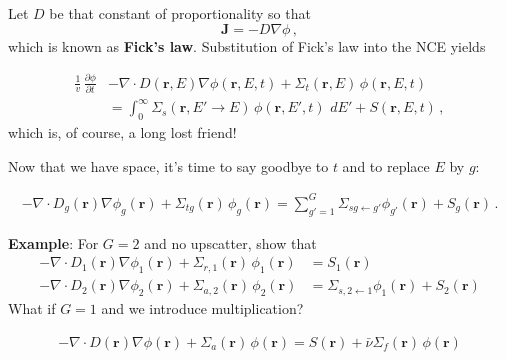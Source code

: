 \documentclass[compact]{ne630handout}
\newcommand{\br}{\mathbf{r}}
\newcommand{\flux}{\phi}
\newcommand{\dE}{\,dE}
\begin{document}
\begin{handoutflow}
Let $D$ be that constant of proportionality so that
\begin{equation*}
\tag{FNRP 6.11}
   \mathbf{J} = -D \nabla \phi \, ,
\end{equation*}
which is known as {\bf Fick's law}.  Substitution of Fick's law
into the NCE yields

\begin{align*}
  \frac{1}{v}\,\frac{\partial \flux}{\partial t}
  &- \nabla\!\cdot\! D(\br,E) \nabla \phi(\br,E,t)
   +\Sigma_t(\br,E)\, \flux(\br,E,t)\\
  &=
  \int_0^\infty \Sigma_s(\br, E'\!\to\!E)\, \flux(\br,E',t)\, \dE'
  + S(\br,E,t) \, ,
\end{align*}
which is, of course, a long lost friend!



Now that we have space, it's time to say goodbye to $t$ and to
replace $E$ by $g$:

\begin{align*}
 - \nabla\!\cdot\! D_g(\br) \nabla \phi_g(\br)
   + \Sigma_{tg}(\br)\, \flux_g(\br)
  = \sum_{g'=1}^{G} \Sigma_{sg\gets g'} \phi_{g'}(\br) +  S_g(\br) \, .
\end{align*}

{\bf Example}: For $G=2$ and no upscatter, show that
\begin{align*}
 - \nabla\!\cdot\! D_1(\br) \nabla \phi_1(\br)
   + \Sigma_{r,1}(\br)\, \flux_1(\br)
  &=  S_1(\br) \\
 - \nabla\!\cdot\! D_2(\br) \nabla \phi_2(\br)
   + \Sigma_{a,2}(\br)\, \flux_2(\br)
  &=  \Sigma_{s,2\gets 1} \phi_{1}(\br) + S_2(\br)
\end{align*}
What if $G=1$ and we introduce multiplication?


\begin{align*}
\tag{FNRP 6.12}
\boxed{ - \nabla\!\cdot\! D(\br) \nabla \phi(\br)
   + \Sigma_{a}(\br)\, \flux(\br)
  =  S(\br) + \bar{\nu}\Sigma_{f}(\br)\, \flux(\br)
}
\end{align*}




\end{handoutflow}
\end{document}
